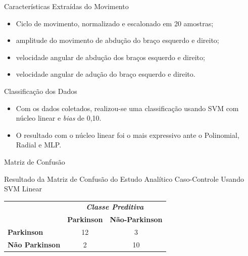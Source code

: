 \documentclass{beamer}
\begin{document}
\begin{frame}{Características Extraídas do Movimento}
	\begin{block}{}
		\begin{itemize}[<+->]
			\item	Ciclo de movimento, normalizado e escalonado em 20 amostras;
			\item	amplitude do movimento de abdução do braço esquerdo e direito;
			\item	velocidade angular de abdução dos braços esquerdo e direito;
			\item velocidade angular de adução do braço esquerdo e direito.
		\end{itemize}
	\end{block}
\end{frame}

\begin{frame}{Classificação dos Dados}
	\begin{block}{}
		\begin{itemize}[<+->]
			\item	Com os dados coletados, realizou-se uma classificação usando SVM com núcleo linear e \textit{bias} de 0,10.
			\item	O resultado com o núcleo linear foi o mais expressivo ante o Polinomial, Radial e MLP.
		\end{itemize}
	\end{block}
\end{frame}

\begin{frame}{Matriz de Confusão}
	\begin{block}{Resultado da Matriz de Confusão do Estudo Analítico Caso-Controle Usando SVM Linear}
\begin{table}[!htbp]
		\label{table:resultadomatrizconfusaosvm}
		\centering
		\begin{tabular}{l|c|c|}
		\cline{2-3}
		\multicolumn{1}{c}{}                         & \multicolumn{2}{|c|}{\textit{\textbf{Classe Preditiva}}} \\ \cline{2-3} 
																								 & \textbf{Parkinson}      & \textbf{Não-Parkinson}         \\ \hline
		\multicolumn{1}{|l|}{\textbf{Parkinson}} & 12       & 3           \\ \hline
		\multicolumn{1}{|l|}{\textbf{Não Parkinson}}     & 2           & 10     \\ \hline
		\end{tabular}
\end{table}
	\end{block}
\end{frame}
\end{document}
